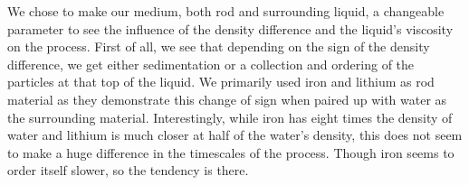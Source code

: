 
We chose to make our medium, both rod and surrounding liquid, a changeable parameter to see
the influence of the density difference and the liquid's viscosity on the process. First of all, we see
that depending on the sign of the density difference, we get either sedimentation or a collection and ordering of the particles at that top of the liquid. We primarily used iron and lithium as rod
material as they demonstrate this change of sign when paired up with water as the surrounding
material. Interestingly, while iron has eight times the density of water and lithium is much closer at half of the water’s density, this does not seem to make a huge difference in the timescales of the
process. Though iron seems to order itself slower, so the tendency is there.\\
\begin{figure}[h]
  \begin{minipage}[t]{0.45\textwidth}
  \end{minipage}
  \hfill
  \begin{minipage}[t]{0.45\textwidth}

\end{minipage}
\end{figure}

